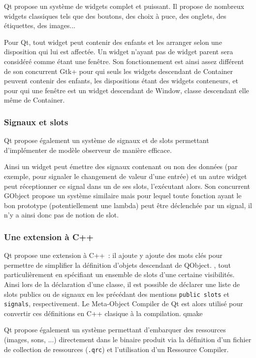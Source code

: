 Qt propose un système de widgets complet et puissant. Il propose de nombreux widgets classiques tels que des boutons, des choix à puce, des onglets, des étiquettes, des images...

Pour Qt, tout widget peut contenir des enfants et les arranger selon une disposition qui lui est affectée. Un widget n'ayant pas de widget parent sera considéré comme étant une fenêtre.
Son fonctionnement est ainsi assez différent de son concurrent Gtk+ pour qui seuls les widgets descendant de Container peuvent contenir des enfants, les dispositions étant des widgets conteneurs, et pour qui une fenêtre est un widget descendant de Window, classe descendant elle même de Container.

\subsubsection{Signaux et slots}

Qt propose également un système de signaux et de slots permettant d'implémenter de modèle observeur de manière efficace.

Ainsi un widget peut émettre des signaux contenant ou non des données (par exemple, pour signaler le changement de valeur d'une entrée) et un autre widget peut réceptionner ce signal dans un de ses slots, l'exécutant alors.
Son concurrent GObject propose un système similaire mais pour lequel toute fonction ayant le bon prototype (potentiellement une lambda) peut être déclenchée par un signal, il n'y a ainsi donc pas de notion de slot.

\subsubsection{Une extension à C++}

Qt propose une extension à C++~: il ajoute y ajoute des mots clés pour permettre de simplifier la définition d'objets descendant de QObject.
, tout particulièrement en spécifiant un ensemble de slots d'une certaine visibilités.
Ainsi lors de la déclaration d'une classe, il est possible de déclarer une liste de slots publics ou de signaux en les précédant des mentions \verb|public slots| et \verb|signals|, respectivement.
Le Meta-Object Compiler de Qt est alors utilisé pour convertir ces définitions en C++ clasique à la compilation.
qmake

Qt propose également un système permettant d'embarquer des ressources (images, sons, ...) directement dans le binaire produit via la définition d'un fichier de collection de ressources (\verb|.qrc|) et l'utilisation d'un Ressource Compiler.

